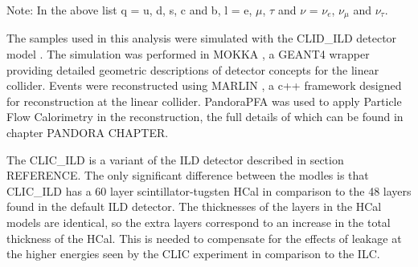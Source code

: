 Note: In the above list q = u, d, s, c and b, l = e, $\mu$, $\tau$ and $\nu$ = $\nu_{e}$, $\nu_{\mu}$ and $\nu_{\tau}$.

The samples used in this analysis were simulated with the CLID\_ILD detector model \cite{arXiv:1006.3396}.  The simulation was performed in MOKKA \cite{MoradeFreitas:2002kj}, a GEANT4 \cite{Agostinelli:2002hh} wrapper providing detailed geometric descriptions of detector concepts for the linear collider.  Events were reconstructed using MARLIN \cite{Gaede:2006pj}, a c++ framework designed for reconstruction at the linear collider.  PandoraPFA \cite{arXiv:0907.3577, arXiv:1209.4039} was used to apply Particle Flow Calorimetry in the reconstruction, the full details of which can be found in chapter PANDORA CHAPTER.
 
The CLIC\_ILD is a variant of the ILD detector described in section REFERENCE.  The only significant difference between the modles is that CLIC\_ILD has a 60 layer scintillator-tugsten HCal in comparison to the 48 layers found in the default ILD detector.  The thicknesses of the layers in the HCal models are identical, so the extra layers correspond to an increase in the total thickness of the HCal.  This is needed to compensate for the effects of leakage at the higher energies seen by the CLIC experiment in comparison to the ILC. 

